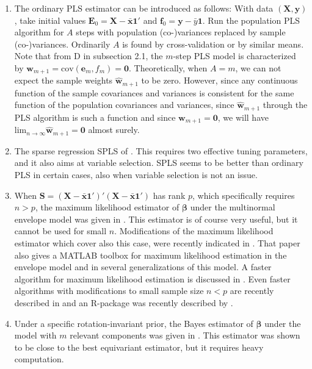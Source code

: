 \documentclass[num-refs]{wiley-article}
\begin{document}
\begin{enumerate}[label=\alph*.]

\item The ordinary PLS estimator can be introduced as follows: With data $(\bm{X},\bm{y})$, take initial values $\bm{E}_{0}=\bm{X}-\bar{\bm{x}}\bm{1}'$
  and $\bm{f}_{0}=\bm{y}-\bar{y}\bm{1}$. Run the population PLS algorithm for $A$ steps with population (co-)variances replaced by sample (co-)variances.
  Ordinarily $A$ is found by cross-validation or by similar means. Note that from D in subsection 2.1, the $m$-step PLS model is characterized by $\bm{w}_{m+1}=\mathrm{cov}(\bm{e}_m,f_m)=\bm{0}$. Theoretically, when $A=m$, we can not expect the sample weights $\widehat{\bm{w}}_{m+1}$
  to be zero. However, since any continuous function of the sample covariances and variances is consistent for the same function of the
  population covariances and variances, since  $\widehat{\bm{w}}_{m+1}$ through the PLS algorithm is such a function and since $\bm{w}_{m+1}=\bm{0}$, we will have ${\mathrm{lim}_{n\rightarrow\infty}}\widehat{\bm{w}}_{m+1}=\bm{0}$ almost surely.
  \smallskip

\item The sparse regression SPLS of \citet{chun2010sparse}. This requires two effective tuning parameters, and it also aims at variable selection. SPLS seems to be better than ordinary PLS in certain cases, also when variable selection is not an issue.
  \smallskip

\item When $\bm{S}=(\bm{X}-\bar{\bm{x}}\bm{1}')'(\bm{X}-\bar{\bm{x}}\bm{1}')$ has rank $p$, which specifically requires $n>p$, the maximum likelihood
  estimator of $\bm{\beta}$ under the multinormal envelope model was given in \citet{cook2013envelopes}. This estimator is of course very useful, but it cannot be used for small $n$. Modifications of the maximum likelihood estimator which cover also this case, were recently indicated in \citet{cook2015envlp}. That paper also gives a MATLAB toolbox for maximum likelihood estimation in the envelope model and in several generalizations of this model. A faster algorithm for maximum likelihood estimation is discussed in \citet{cook2016algorithms}. Even faster algorithms with modifications to small sample size $n<p$ are recently described in \citet{CookZhang2018} and an R-package was recently described by \citet{cook2016note}.
  \smallskip

\item Under a specific rotation-invariant prior, the Bayes estimator of $\bm{\beta}$ under the model with $m$ relevant components was given in \citet{helland2012near}. This estimator was shown to be close to the best equivariant estimator, but it requires heavy computation.
 

\end{enumerate}
\end{document}
